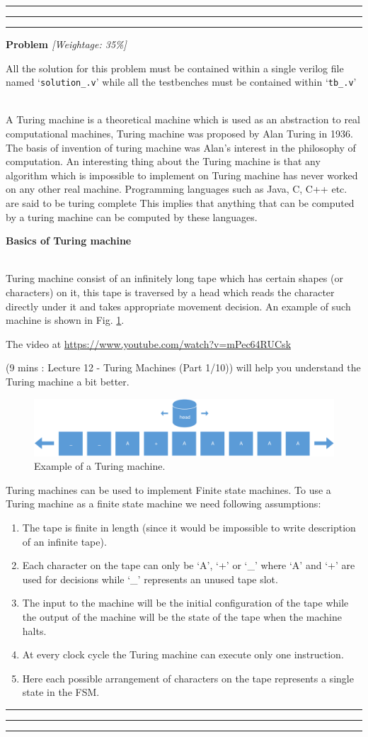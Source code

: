 \documentclass[a4paper,10pt]{article}
\theoremstyle{mytheor}
\newcounter{problemNumber}
\newcommand {
  \insertProblem}[2]{
  \vspace{0.5cm}
  \hrule \hrule \hrule
  \vspace{0.3cm}
  
  {
    \setlength{\parindent}{0}

    {
      \color{greatblue}
      \textbf{\Large{Problem \theproblemNumber}}
      \hfill
      \textit{[Weightage: #1]}
    }

    {
      \centering
      \begin{center}
        \lfseries \footnotesize All the solution for this problem
        must be contained within a single verilog file named
        `\texttt{solution\_\theproblemNumber.v}' while all the
        testbenches must be contained within
          `\texttt{tb\_\theproblemNumber.v}'
        \end{center}
      }
      
    }
    
  \vspace{6pt}\\#2

  \addtocounter{problemNumber}{1}

  \vspace{0.2cm}
  \hrule \hrule \hrule
  \vspace{0.5cm}
}
\newcommand{\problemheading}[1] {
  \vspace{0.3cm}

  {
    \setlength{\parindent}{0}
    \textbf{#1}
  }

  \vspace{0.05cm}
}
\newcommand{\amurl}[1]{%
  {\color{blue}\url{#1}}
}
\begin{document}
 \insertProblem {35\%} { A Turing machine is a theoretical machine which is
   used as an abstraction to real computational machines, Turing
   machine was proposed by Alan Turing in 1936. The basis of invention
   of turing machine was Alan's interest in the philosophy of
   computation. An interesting thing about the Turing machine is that
   any algorithm which is impossible to implement on Turing machine
   has never worked on any other real machine. Programming languages
   such as Java, C, C++ etc. are said to be turing complete This
   implies that anything that can be computed by a turing machine can
   be computed by these languages.

   \problemheading{Basics of Turing machine}\\ Turing machine consist
   of an infinitely long tape which has certain shapes (or characters)
   on it, this tape is traversed by a head which reads the character
   directly under it and takes appropriate movement decision. An
   example of such machine is shown in
   Fig. \ref{Fig:turing-machine-example}.

   The video at \amurl{https://www.youtube.com/watch?v=mPec64RUCsk}
   (9 mins : Lecture 12 - Turing Machines (Part 1/10)) will help you
   understand the Turing machine a bit better.

  \begin{figure}[!h] \centering  
    \includegraphics[width=\linewidth]{./resources/turingMachine.pdf} 
    \caption{Example of a Turing machine.} 
    \label{Fig:turing-machine-example} 
  \end{figure}

  Turing machines can be used to implement Finite state machines. To use
  a Turing machine as a finite state machine we need following
  assumptions:
  \begin{enumerate}
  \item The tape is finite in length (since it would be impossible
    to write description of an infinite tape).
  \item Each character on the tape can only be `A', `+' or `\_' where
    `A' and `+' are used for decisions while `\_' represents an unused
    tape slot.
  \item The input to the machine will be the initial configuration
    of the tape while the output of the machine will be the state of
    the tape when the machine halts.
  \item At every clock cycle the Turing machine can execute only one
    instruction.
  \item Here each possible arrangement of characters on the tape
    represents a single state in the FSM.
  \end{enumerate}

}
\end{document}
